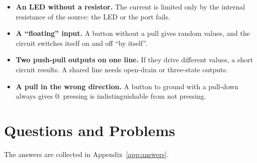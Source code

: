 \begin{warnbox}
\begin{itemize}
  \item \textbf{An LED without a resistor.} The current is limited only by the internal
        resistance of the source: the LED or the port fails.
  \item \textbf{A ``floating'' input.} A button without a pull gives random values,
        and the circuit switches itself on and off ``by itself''.
  \item \textbf{Two push-pull outputs on one line.} If they drive different
        values, a short circuit results. A shared line needs open-drain or
        three-state outputs.
  \item \textbf{A pull in the wrong direction.} A button to ground with a pull-down
        always gives 0: pressing is indistinguishable from not pressing.
\end{itemize}
\end{warnbox}

\section{Questions and Problems}
\label{sec:tasks-electrical}

The answers are collected in Appendix~\ref{app:answers}.

